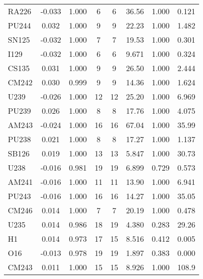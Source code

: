 \begin{tabular}{|l|ccccccc|}
RA226 & -0.033 & 1.000 & 6 & 6 & 36.56 & 1.000 & 0.121\\
PU244 & 0.032 & 1.000 & 9 & 9 & 22.23 & 1.000 & 1.482\\
SN125 & -0.032 & 1.000 & 7 & 7 & 19.53 & 1.000 & 0.301\\
I129 & -0.032 & 1.000 & 6 & 6 & 9.671 & 1.000 & 0.324\\
CS135 & 0.031 & 1.000 & 9 & 9 & 26.50 & 1.000 & 2.444\\
CM242 & 0.030 & 0.999 & 9 & 9 & 14.36 & 1.000 & 1.624\\
U239 & -0.026 & 1.000 & 12 & 12 & 25.20 & 1.000 & 6.969\\
PU239 & 0.026 & 1.000 & 8 & 8 & 17.76 & 1.000 & 4.075\\
AM243 & -0.024 & 1.000 & 16 & 16 & 67.04 & 1.000 & 35.99\\
PU238 & 0.021 & 1.000 & 8 & 8 & 17.27 & 1.000 & 1.137\\
SB126 & 0.019 & 1.000 & 13 & 13 & 5.847 & 1.000 & 30.73\\
U238 & -0.016 & 0.981 & 19 & 19 & 6.899 & 0.729 & 0.573\\
AM241 & -0.016 & 1.000 & 11 & 11 & 13.90 & 1.000 & 6.941\\
PU243 & -0.016 & 1.000 & 16 & 16 & 14.27 & 1.000 & 35.05\\
CM246 & 0.014 & 1.000 & 7 & 7 & 20.19 & 1.000 & 0.478\\
U235 & 0.014 & 0.986 & 18 & 19 & 4.380 & 0.283 & 29.26\\
H1 & 0.014 & 0.973 & 17 & 15 & 8.516 & 0.412 & 0.005\\
O16 & -0.013 & 0.978 & 19 & 19 & 1.897 & 0.383 & 0.000\\
CM243 & 0.011 & 1.000 & 15 & 15 & 8.926 & 1.000 & 108.9\\
\hline
\end{tabular}